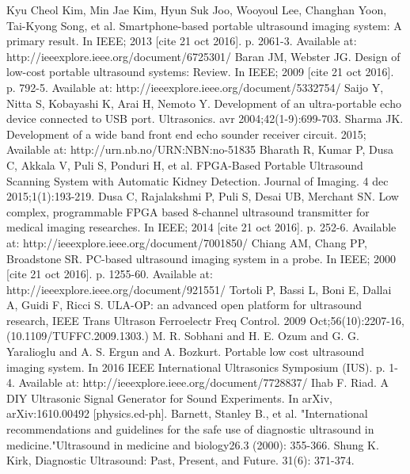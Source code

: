 \documentclass[letterpaper, 10 pt, conference]{ieeeconf} %
\begin{document}
\begin{thebibliography}{99}
 Kyu Cheol Kim, Min Jae Kim, Hyun Suk Joo, Wooyoul Lee, Changhan Yoon, Tai-Kyong Song, et al. Smartphone-based portable ultrasound imaging system: A primary result. In IEEE; 2013 [cite 21 oct 2016]. p. 2061-3. Available at: http://ieeexplore.ieee.org/document/6725301/
 Baran JM, Webster JG. Design of low-cost portable ultrasound systems: Review. In IEEE; 2009 [cite 21 oct 2016]. p. 792-5. Available at: http://ieeexplore.ieee.org/document/5332754/
 Saijo Y, Nitta S, Kobayashi K, Arai H, Nemoto Y. Development of an ultra-portable echo device connected to USB port. Ultrasonics. avr 2004;42(1-9):699-703. 
 Sharma JK. Development of a wide band front end echo sounder receiver circuit. 2015; Available at: http://urn.nb.no/URN:NBN:no-51835
 Bharath R, Kumar P, Dusa C, Akkala V, Puli S, Ponduri H, et al. FPGA-Based Portable Ultrasound Scanning System with Automatic Kidney Detection. Journal of Imaging. 4 dec 2015;1(1):193-219. 
 Dusa C, Rajalakshmi P, Puli S, Desai UB, Merchant SN. Low complex, programmable FPGA based 8-channel ultrasound transmitter for medical imaging researches. In IEEE; 2014 [cite 21 oct 2016]. p. 252-6. Available at: http://ieeexplore.ieee.org/document/7001850/ 
 Chiang AM, Chang PP, Broadstone SR. PC-based ultrasound imaging system in a probe. In IEEE; 2000 [cite 21 oct 2016]. p. 1255-60. Available at: http://ieeexplore.ieee.org/document/921551/
 Tortoli P, Bassi L, Boni E, Dallai A, Guidi F, Ricci S. ULA-OP: an advanced open platform for ultrasound research, IEEE Trans Ultrason Ferroelectr Freq Control. 2009 Oct;56(10):2207-16, (10.1109/TUFFC.2009.1303.)
 M. R. Sobhani and H. E. Ozum and G. G. Yaralioglu and A. S. Ergun and A. Bozkurt. Portable low cost ultrasound imaging system. In 2016 IEEE International Ultrasonics Symposium (IUS). p. 1-4. Available at: http://ieeexplore.ieee.org/document/7728837/
 Ihab F. Riad. A DIY Ultrasonic Signal Generator for Sound Experiments. In arXiv, arXiv:1610.00492 [physics.ed-ph].
 Barnett, Stanley B., et al. "International recommendations and guidelines for the safe use of diagnostic ultrasound in medicine."Ultrasound in medicine and biology26.3 (2000): 355-366.
 Shung K. Kirk, Diagnostic Ultrasound: Past, Present, and Future. 31(6): 371-374.


\end{thebibliography}
\end{document}
